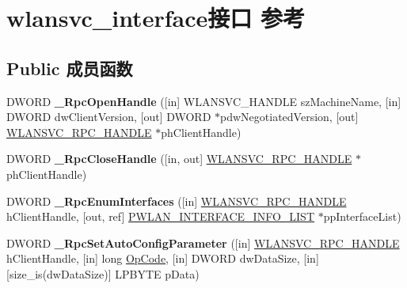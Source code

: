 \hypertarget{interfacewlansvc__interface}{}\section{wlansvc\+\_\+interface接口 参考}
\label{interfacewlansvc__interface}
\subsection*{Public 成员函数}
\begin{DoxyCompactItemize}
\item 
\mbox{\label{interfacewlansvc__interface_add9385a07be7a53bd00ea17be488d5de}} 
D\+W\+O\+RD {\bfseries \+\_\+\+Rpc\+Open\+Handle} (\mbox{[}in\mbox{]} W\+L\+A\+N\+S\+V\+C\+\_\+\+H\+A\+N\+D\+LE sz\+Machine\+Name, \mbox{[}in\mbox{]} D\+W\+O\+RD dw\+Client\+Version, \mbox{[}out\mbox{]} D\+W\+O\+RD $\ast$pdw\+Negotiated\+Version, \mbox{[}out\mbox{]} \hyperlink{interfacevoid}{W\+L\+A\+N\+S\+V\+C\+\_\+\+R\+P\+C\+\_\+\+H\+A\+N\+D\+LE} $\ast$ph\+Client\+Handle)
\item 
\mbox{\label{interfacewlansvc__interface_acffe0c94dc6094da9006d3015a5eae19}} 
D\+W\+O\+RD {\bfseries \+\_\+\+Rpc\+Close\+Handle} (\mbox{[}in, out\mbox{]} \hyperlink{interfacevoid}{W\+L\+A\+N\+S\+V\+C\+\_\+\+R\+P\+C\+\_\+\+H\+A\+N\+D\+LE} $\ast$ph\+Client\+Handle)
\item 
\mbox{\label{interfacewlansvc__interface_a8e22dc7427e191d26060155767f72deb}} 
D\+W\+O\+RD {\bfseries \+\_\+\+Rpc\+Enum\+Interfaces} (\mbox{[}in\mbox{]} \hyperlink{interfacevoid}{W\+L\+A\+N\+S\+V\+C\+\_\+\+R\+P\+C\+\_\+\+H\+A\+N\+D\+LE} h\+Client\+Handle, \mbox{[}out, ref\mbox{]} \hyperlink{struct___w_l_a_n___i_n_t_e_r_f_a_c_e___i_n_f_o___l_i_s_t}{P\+W\+L\+A\+N\+\_\+\+I\+N\+T\+E\+R\+F\+A\+C\+E\+\_\+\+I\+N\+F\+O\+\_\+\+L\+I\+ST} $\ast$pp\+Interface\+List)
\item 
\mbox{\label{interfacewlansvc__interface_a1a3c45329d508a7cf15a000161f6a276}} 
D\+W\+O\+RD {\bfseries \+\_\+\+Rpc\+Set\+Auto\+Config\+Parameter} (\mbox{[}in\mbox{]} \hyperlink{interfacevoid}{W\+L\+A\+N\+S\+V\+C\+\_\+\+R\+P\+C\+\_\+\+H\+A\+N\+D\+LE} h\+Client\+Handle, \mbox{[}in\mbox{]} long \hyperlink{dlist_8c_abeb7dfb0e9e2b3114e240a405d046ea7}{Op\+Code}, \mbox{[}in\mbox{]} D\+W\+O\+RD dw\+Data\+Size, \mbox{[}in\mbox{]}\mbox{[}size\+\_\+is(dw\+Data\+Size)\mbox{]} L\+P\+B\+Y\+TE p\+Data)

\end{DoxyCompactItemize}
